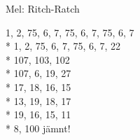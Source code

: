 \begin{SongText}[Siffervisan]
    \begin{SongInfo}
        Mel: Ritch-Ratch
    \end{SongInfo}
    \begin{SongVerse}
        1, 2, 75, 6, 7, 75, 6, 7, 75, 6, 7\\*%
        1, 2, 75, 6, 7, 75, 6, 7, 22\\*%
        107, 103, 102\\*%
        107, 6, 19, 27\\*%
        17, 18, 16, 15\\*%
        13, 19, 18, 17\\*%
        19, 16, 15, 11\\*%
        8, 100 jämnt!
    \end{SongVerse}
\end{SongText}
